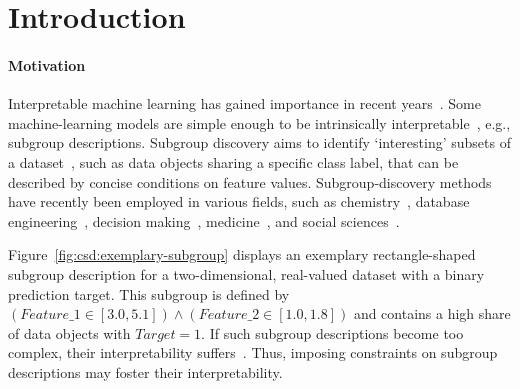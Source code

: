\documentclass[acmsmall]{acmart} %
\theoremstyle{acmplain}
\theoremstyle{acmdefinition}
\begin{document}



\maketitle

\section{Introduction}
\label{sec:csd:introduction}

\paragraph{Motivation}

Interpretable machine learning has gained importance in recent years~\cite{carvalho2019machine, molnar2020interpretable}.
Some machine-learning models are simple enough to be intrinsically interpretable~\cite{carvalho2019machine}, e.g., subgroup descriptions.
Subgroup discovery aims to identify `interesting' subsets of a dataset~\cite{atzmueller2015subgroup}, such as data objects sharing a specific class label, that can be described by concise conditions on feature values.
Subgroup-discovery methods have recently been employed in various fields, such as chemistry~\cite{li2021subgroup}, database engineering~\cite{remil2021makes}, decision making~\cite{zuheros2023explainable}, medicine~\cite{esnault2020qfinder}, and social sciences~\cite{kiefer2022subgroup}.

Figure~\ref{fig:csd:exemplary-subgroup} displays an exemplary rectangle-shaped subgroup description for a two-dimensional, real-valued dataset with a binary prediction target.
This subgroup is defined by $(\mathit{Feature\_1} \in [3.0, 5.1]) \land (\mathit{Feature\_2} \in [1.0, 1.8])$ and contains a high share of data objects with $\mathit{Target} = 1$.
If such subgroup descriptions become too complex, their interpretability suffers~\cite{meeng2021real}.
Thus, imposing constraints on subgroup descriptions may foster their interpretability.
\end{document}
